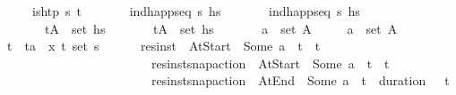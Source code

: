 \begin{isabellebody}
\ \ \ \ \ {\isachardoublequoteopen}is{\isacharunderscore}{\kern0pt}htp\ {\isasympi}s\ t{\isachardoublequoteclose}\isanewline
\ \ \ \ \ \ \ {\isachardoublequoteopen}ind{\isacharunderscore}{\kern0pt}happ{\isacharunderscore}{\kern0pt}seq\ {\isasympi}s\ hs{\isachardoublequoteclose}\isanewline
\ \ \ \ \ \ \ {\isachardoublequoteopen}ind{\isacharunderscore}{\kern0pt}happ{\isacharunderscore}{\kern0pt}seq\ {\isasympi}s\ hs{\isacharprime}{\kern0pt}{\isachardoublequoteclose}\isanewline
\ \ \ \ \ \ \ {\isachardoublequoteopen}{\isacharparenleft}{\kern0pt}t{\isacharcomma}{\kern0pt}A{\isacharparenright}{\kern0pt}\ {\isasymin}\ set\ hs{\isachardoublequoteclose}\isanewline
\ \ \ \ \ \ \ {\isachardoublequoteopen}{\isacharparenleft}{\kern0pt}t{\isacharcomma}{\kern0pt}A{\isacharprime}{\kern0pt}{\isacharparenright}{\kern0pt}\ {\isasymin}\ set\ hs{\isacharprime}{\kern0pt}{\isachardoublequoteclose}\isanewline
\ \ \ \ \ \ \ {\isachardoublequoteopen}a\ {\isasymin}\ set\ A{\isachardoublequoteclose}\isanewline
\ \ \ \ \ {\isachardoublequoteopen}a\ {\isasymin}\ set\ A{\isacharprime}{\kern0pt}{\isachardoublequoteclose}\isanewline
%
\isadelimproof
\ \ %
\endisadelimproof
%
\isatagproof
{}\isamarkupfalse%
{\isacharminus}{\kern0pt}\isanewline
\ \ \ \ \isamarkupfalse%
\ t\isactrlsub {\isasympi}\ {\isasympi}\ ta\ \ x{\isacharcolon}{\kern0pt}\ {\isachardoublequoteopen}{\isacharparenleft}{\kern0pt}t\isactrlsub {\isasympi}{\isacharcomma}{\kern0pt}\ {\isasympi}{\isacharparenright}{\kern0pt}{\isasymin}set\ {\isasympi}s{\isachardoublequoteclose}\isanewline
\ \ \ \ \ \ {\isachardoublequoteopen}{\isacharparenleft}{\kern0pt}res{\isacharunderscore}{\kern0pt}inst\ {\isasympi}\ At{\isacharunderscore}{\kern0pt}Start\ {\isacharequal}{\kern0pt}\ Some\ a\ {\isasymand}\ t\isactrlsub {\isasympi}\ {\isacharequal}{\kern0pt}\ t{\isacharparenright}{\kern0pt}\isanewline
\ \ \ \ \ \ \ \ \ \ \ \ \ \ \ \ \ \ \ \ \ \ \ {\isasymor}\ {\isacharparenleft}{\kern0pt}res{\isacharunderscore}{\kern0pt}inst{\isacharunderscore}{\kern0pt}snap{\isacharunderscore}{\kern0pt}action\ {\isasympi}\ At{\isacharunderscore}{\kern0pt}Start\ {\isacharequal}{\kern0pt}\ Some\ a\ {\isasymand}\ t\isactrlsub {\isasympi}\ {\isacharequal}{\kern0pt}\ t{\isacharparenright}{\kern0pt}\isanewline
\ \ \ \ \ \ \ \ \ \ \ \ \ \ \ \ \ \ \ \ \ \ \ {\isasymor}\ {\isacharparenleft}{\kern0pt}res{\isacharunderscore}{\kern0pt}inst{\isacharunderscore}{\kern0pt}snap{\isacharunderscore}{\kern0pt}action\ {\isasympi}\ At{\isacharunderscore}{\kern0pt}End\ {\isacharequal}{\kern0pt}\ Some\ a\ {\isasymand}\ t\isactrlsub {\isasympi}\ {\isacharplus}{\kern0pt}\ {\isacharparenleft}{\kern0pt}duration\ {\isasympi}{\isacharparenright}{\kern0pt}\ {\isacharequal}{\kern0pt}\ t{\isacharparenright}{\kern0pt}{\isachardoublequoteclose}\isanewline

\end{isabellebody}

